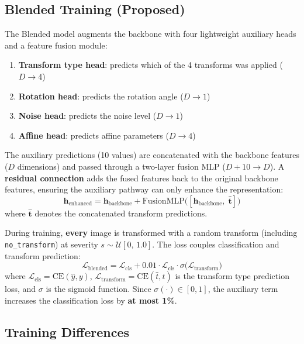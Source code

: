 \documentclass[11pt,a4paper]{article}
\begin{document}
\subsection{Blended Training (Proposed)}

The Blended model augments the backbone with four lightweight auxiliary heads and a feature fusion module:

\begin{enumerate}
    \item \textbf{Transform type head}: predicts which of the 4 transforms was applied ($D \to 4$)
    \item \textbf{Rotation head}: predicts the rotation angle ($D \to 1$)
    \item \textbf{Noise head}: predicts the noise level ($D \to 1$)
    \item \textbf{Affine head}: predicts affine parameters ($D \to 4$)
\end{enumerate}

The auxiliary predictions (10 values) are concatenated with the backbone features ($D$ dimensions) and passed through a two-layer fusion MLP ($D{+}10 \to D$). A \textbf{residual connection} adds the fused features back to the original backbone features, ensuring the auxiliary pathway can only enhance the representation:
\begin{equation}
    \mathbf{h}_{\text{enhanced}} = \mathbf{h}_{\text{backbone}} + \text{FusionMLP}\big([\mathbf{h}_{\text{backbone}},\; \hat{\mathbf{t}}]\big)
\end{equation}
where $\hat{\mathbf{t}}$ denotes the concatenated transform predictions.

During training, \textbf{every} image is transformed with a random transform (including \texttt{no\_transform}) at severity $s \sim \mathcal{U}[0,\, 1.0]$. The loss couples classification and transform prediction:
\begin{equation}
    \mathcal{L}_{\text{blended}} = \mathcal{L}_{\text{cls}} + 0.01 \cdot \mathcal{L}_{\text{cls}} \cdot \sigma\!\big(\mathcal{L}_{\text{transform}}\big)
\end{equation}
where $\mathcal{L}_{\text{cls}} = \text{CE}(\hat{y}, y)$, $\mathcal{L}_{\text{transform}} = \text{CE}(\hat{t}, t)$ is the transform type prediction loss, and $\sigma$ is the sigmoid function. Since $\sigma(\cdot) \in [0, 1]$, the auxiliary term increases the classification loss by \textbf{at most 1\%}.

\subsection{Training Differences}
\end{document}
